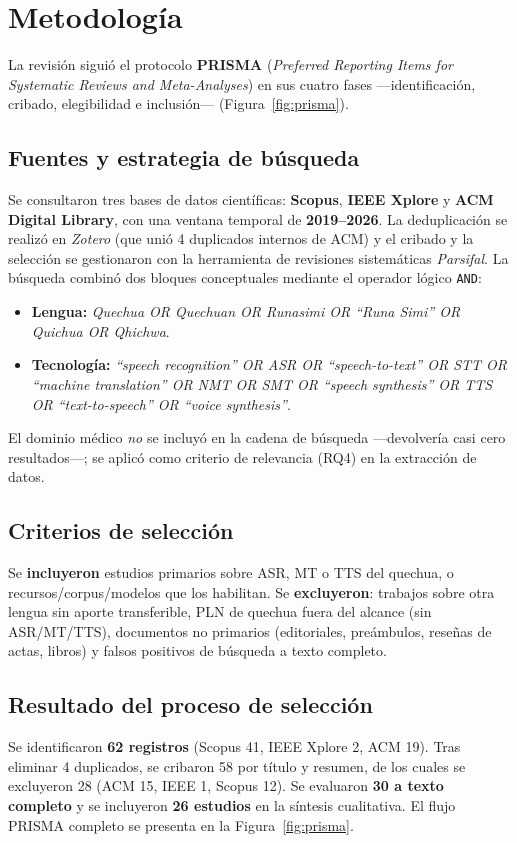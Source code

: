 \documentclass[10pt,twocolumn,a4paper]{article}
\begin{document}
\section{Metodolog\'ia}
La revisi\'on sigui\'o el protocolo \textbf{PRISMA} (\emph{Preferred Reporting Items for Systematic Reviews and Meta-Analyses}) en sus cuatro fases ---identificaci\'on, cribado, elegibilidad e inclusi\'on--- (Figura~\ref{fig:prisma}).

\subsection*{Fuentes y estrategia de b\'usqueda}
Se consultaron tres bases de datos cient\'ificas: \textbf{Scopus}, \textbf{IEEE Xplore} y \textbf{ACM Digital Library}, con una ventana temporal de \textbf{2019--2026}. La deduplicaci\'on se realiz\'o en \emph{Zotero} (que uni\'o 4 duplicados internos de ACM) y el cribado y la selecci\'on se gestionaron con la herramienta de revisiones sistem\'aticas \emph{Parsifal}. La b\'usqueda combin\'o dos bloques conceptuales mediante el operador l\'ogico \texttt{AND}:
\begin{itemize}[label=\textcolor{cBlue}{\scriptsize$\bullet$}]
  \item \textbf{Lengua:} \emph{Quechua OR Quechuan OR Runasimi OR ``Runa Simi'' OR Quichua OR Qhichwa}.
  \item \textbf{Tecnolog\'ia:} \emph{``speech recognition'' OR ASR OR ``speech-to-text'' OR STT OR ``machine translation'' OR NMT OR SMT OR ``speech synthesis'' OR TTS OR ``text-to-speech'' OR ``voice synthesis''}.
\end{itemize}
El dominio m\'edico \emph{no} se incluy\'o en la cadena de b\'usqueda ---devolver\'ia casi cero resultados---; se aplic\'o como criterio de relevancia (RQ4) en la extracci\'on de datos.

\subsection*{Criterios de selecci\'on}
Se \textbf{incluyeron} estudios primarios sobre ASR, MT o TTS del quechua, o recursos/corpus/modelos que los habilitan. Se \textbf{excluyeron}: trabajos sobre otra lengua sin aporte transferible, PLN de quechua fuera del alcance (sin ASR/MT/TTS), documentos no primarios (editoriales, pre\'ambulos, rese\~nas de actas, libros) y falsos positivos de b\'usqueda a texto completo.

\subsection*{Resultado del proceso de selecci\'on}
Se identificaron \textbf{62 registros} (Scopus 41, IEEE Xplore 2, ACM 19). Tras eliminar 4 duplicados, se cribaron 58 por t\'itulo y resumen, de los cuales se excluyeron 28 (ACM 15, IEEE 1, Scopus 12). Se evaluaron \textbf{30 a texto completo} y se incluyeron \textbf{26 estudios} en la s\'intesis cualitativa. El flujo PRISMA completo se presenta en la Figura~\ref{fig:prisma}.
\end{document}
